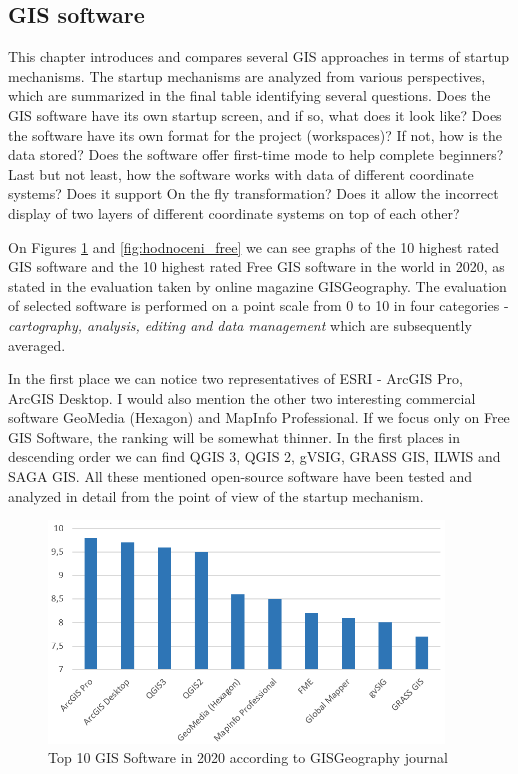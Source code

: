 \documentclass[a4paper,10pt,twoside]{article}
\begin{document}
\subsection{GIS software}

This chapter introduces and compares several GIS approaches in terms of startup mechanisms. The startup mechanisms are analyzed from various perspectives, which are summarized in the final table identifying several questions. Does the GIS software have its own startup screen, and if so, what does it look like? Does the software have its own format for the project (workspaces)? If not, how is the data stored? Does the software offer first-time mode to help complete beginners? Last but not least, how the software works with data of different coordinate systems? Does it support On the fly transformation? Does it allow the incorrect display of two layers of different coordinate systems on top of each other?

On Figures \ref{fig:hodnoceni_all} and  \ref{fig:hodnoceni_free} we can see graphs of the 10 highest rated GIS software and the 10 highest rated Free GIS software in the world in 2020, as stated in the evaluation taken by online magazine GISGeography. The evaluation of selected software is performed on a point scale from 0 to 10 in four categories - \textit{cartography, analysis, editing and data management} which are subsequently averaged. 

In the first place we can notice two representatives of ESRI - ArcGIS Pro, ArcGIS Desktop. I would also mention the other two interesting commercial software GeoMedia (Hexagon) and MapInfo Professional. If we focus only on Free GIS Software, the ranking will be somewhat thinner. In the first places in descending order we can find QGIS 3, QGIS 2, gVSIG, GRASS GIS, ILWIS and SAGA GIS. All these mentioned open-source software have been tested and analyzed in detail from the point of view of the startup mechanism. 

\vspace{0.3cm}
\begin{figure}[hbt!] 
\begin{center}
\includegraphics[width=10.5cm]{../pictures/hodnoceni_all.png} 
\caption[Top 10 GIS Software in 2020 according to GISGeography journal]{Top 10 GIS Software in 2020 according to GISGeography journal}
\label{fig:hodnoceni_all}
\end{center}
\end{figure}
\end{document}
